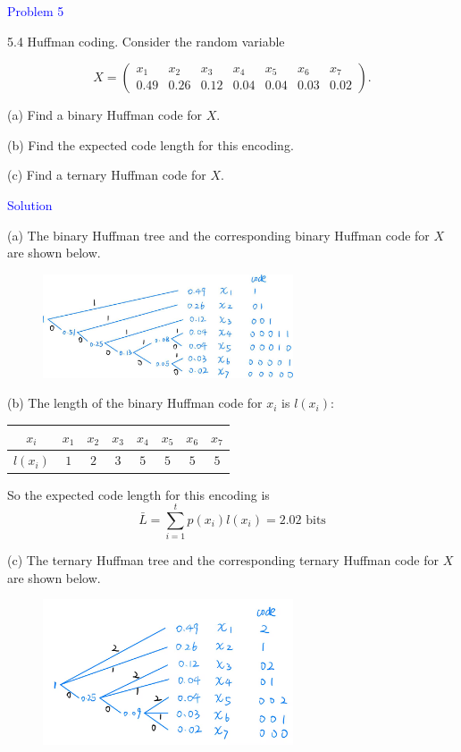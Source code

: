 \textcolor{blue}{Problem 5}

5.4 Huffman coding. Consider the random variable

$$\left.X=\left(\begin{array}{ccccccc}x_1&x_2&x_3&x_4&x_5&x_6&x_7\\0.49&0.26&0.12&0.04&0.04&0.03&0.02\end{array}\right.\right).$$

(a) Find a binary Huffman code for $X$.

(b) Find the expected code length for this encoding.

(c) Find a ternary Huffman code for $X.$

\textcolor{blue}{Solution}

(a) The binary Huffman tree and the corresponding binary Huffman code for $X$ are shown below.
\begin{figure}[htbp]
    \centering
	\includegraphics[width=0.66\textwidth]{../binary_Huffman_coding.png}
\end{figure}

(b) The length of the binary Huffman code for $x_i$ is $l(x_i)$:

\begin{table}[!htbp]
\centering
\begin{tabular}{c|ccccccc}
$x_i$ & $x_1$ & $x_2$ & $x_3$ & $x_4$ & $x_5$ & $x_6$ & $x_7$ \\
\hline
$l(x_i)$ & $1$ & $2$ & $3$ & $5$ & $5$ & $5$ & $5$
\end{tabular}
\end{table}

So the expected code length for this encoding is
$$\bar{L}=\sum_{i=1}^tp(x_i)l(x_i)=2.02\text{\ bits}$$

(c) The ternary Huffman tree and the corresponding ternary Huffman code for $X$ are shown below.
\begin{figure}[htbp]
    \centering
	\includegraphics[width=0.66\textwidth]{../ternary_Huffman_coding.png}
\end{figure}

\newpage